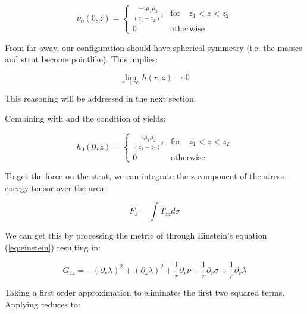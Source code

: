 \documentclass{article}
\begin{document}
\begin{equation}
\label{eq:nu_r=0}
\nu_0 (0,z) = \left\{  \begin{array}{cl}\frac{-4\mu_{1}\mu_{2}}{\left(z_{1}-z_{2}\right)^{2}} & \mbox{for}\quad  z_{1}<z<z_{2} \\ 0 & \mbox{otherwise}\end{array}\right. 
\end{equation}

From far away, our configuration should have spherical symmetry (i.e. the masses and strut become pointlike). This implies:

\begin{equation}
	\label{eq:h-limit}
	\lim_{r\rightarrow \infty} h(r,z)\rightarrow 0
\end{equation}

This reasoning will be addressed in the next section.

Combining  with  and the condition of  yields:

\begin{equation}
\label{eq:h_r=0}
h_0 (0,z) = \left\{  \begin{array}{cl}\frac{4\mu_{1}\mu_{2}}{\left(z_{1}-z_{2}\right)^{2}} & \mbox{for}\quad  z_{1}<z<z_{2} \\ 0 & \mbox{otherwise}\end{array}\right. 
\end{equation}

To get the force on the strut, we can integrate the z-component of the stress-energy tensor over the area:

\begin{equation}
	\label{eq:F_z}
	F_{z}=\int T_{zz}d\sigma
\end{equation}

We can get this by processing the metric of  through Einstein's equation (\ref{eq:einstein}) resulting in:

\begin{equation}
\label{eq:G_zz}
G_{zz}=-\left(\partial_{r}\lambda\right)^{2}+\left(\partial_{z}\lambda\right)^{2}+\frac{1}{r}\partial_{r}\nu -\frac{1}{r}\partial_{r}\sigma +\frac{1}{r}\partial_{r}\lambda 
\end{equation}

Taking a first order approximation to  eliminates the first two squared terms. Applying  reduces to:
\end{document}
